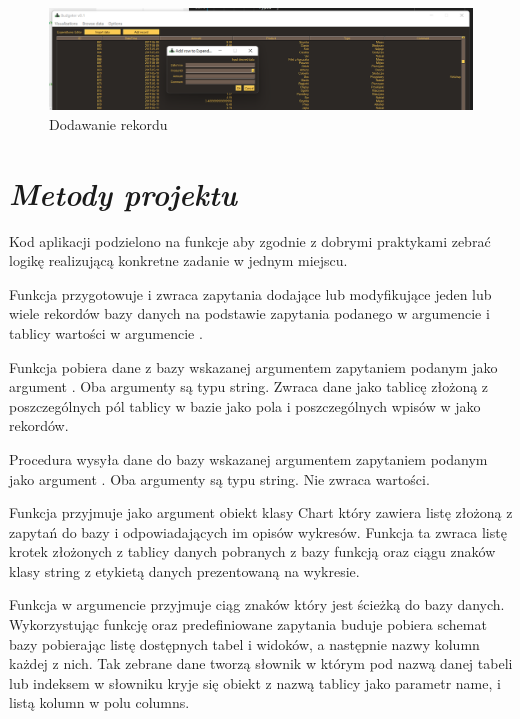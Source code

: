 \documentclass[a4paper,10pt, twoside]{report}
\newcommand{\customstylesection}[1]{\textbf{\textit{#1}}}
\begin{document}
\begin{figure}[H]           %
    \caption{Dodawanie rekordu}
    \label{fig:Dodawanie rekordu}
    \centering  
    \includegraphics[width=12cm]{figures/Interface_Browse_AddRecord_v0.3.png}
\end{figure}

\section{\customstylesection{Metody projektu}} 
\label{Metody projektu}
{Kod aplikacji podzielono na funkcje aby zgodnie z dobrymi praktykami zebrać 
logikę realizującą konkretne zadanie w jednym miejscu.}

\medskip
{Funkcja  przygotowuje i zwraca 
zapytania dodające lub modyfikujące jeden lub wiele rekordów bazy danych na 
podstawie zapytania podanego w argumencie  i tablicy wartości 
w argumencie .}

\medskip
{Funkcja  pobiera dane z bazy wskazanej 
argumentem  zapytaniem podanym jako argument 
. Oba argumenty są typu string. Zwraca dane jako tablicę 
złożoną z poszczególnych pól tablicy w bazie jako pola i poszczególnych 
wpisów w jako rekordów.}

\medskip
{Procedura  wysyła dane do bazy wskazanej
argumentem  zapytaniem podanym jako argument 
. Oba argumenty są typu string. Nie zwraca wartości.}

\medskip
{Funkcja  przyjmuje jako argument 
 obiekt klasy Chart który zawiera listę złożoną z zapytań
 do bazy i odpowiadających im opisów wykresów. Funkcja ta zwraca listę krotek 
złożonych z tablicy danych pobranych z bazy funkcją  oraz 
ciągu znaków klasy string z etykietą danych prezentowaną na wykresie.}

\medskip
{Funkcja  w argumencie  
przyjmuje ciąg znaków który jest ścieżką do bazy danych. Wykorzystując funkcję 
 oraz predefiniowane zapytania buduje pobiera schemat bazy
 pobierając listę dostępnych tabel i widoków, a następnie nazwy kolumn każdej z 
nich. Tak zebrane dane tworzą słownik w którym pod nazwą danej tabeli lub 
indeksem w słowniku kryje się obiekt z nazwą tablicy jako parametr name, i listą
 kolumn w polu columns.}
\end{document}
